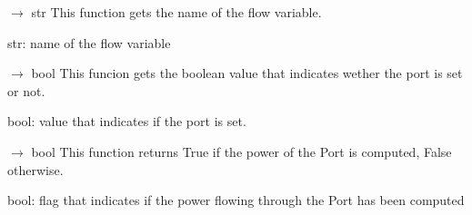 \documentclass[letterpaper,10pt,english]{sphinxmanual}
\begin{document}
\begin{fulllineitems}
\begin{fulllineitems}
\begin{description}
\end{description}

\end{fulllineitems}


\begin{fulllineitems}
\label{\detokenize{scrimp:scrimp.port.Port.get_flow}}
\pysigstartsignatures
\pysiglinewithargsret
{}
{}
{{ $\rightarrow$ str}}
\pysigstopsignatures
\sphinxAtStartPar
This function gets the name of the flow variable.
\begin{description}
\sphinxAtStartPar
str: name of the flow variable

\end{description}

\end{fulllineitems}


\begin{fulllineitems}
\label{\detokenize{scrimp:scrimp.port.Port.get_isSet}}
\pysigstartsignatures
\pysiglinewithargsret
{}
{}
{{ $\rightarrow$ bool}}
\pysigstopsignatures
\sphinxAtStartPar
This funcion gets the boolean value that indicates wether the port is set or not.
\begin{description}
\sphinxAtStartPar
bool: value that indicates if the port is set.

\end{description}

\end{fulllineitems}


\begin{fulllineitems}
\label{\detokenize{scrimp:scrimp.port.Port.get_is_computed}}
\pysigstartsignatures
\pysiglinewithargsret
{}
{}
{{ $\rightarrow$ bool}}
\pysigstopsignatures
\sphinxAtStartPar
This function returns True if the power of the Port is computed, False otherwise.
\begin{description}
\sphinxAtStartPar
bool: flag that indicates if the power flowing through the Port has been computed


\end{description}
\end{fulllineitems}
\end{fulllineitems}
\end{document}
